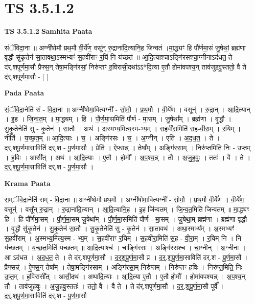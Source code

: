 \documentclass[17pt]{extarticle}
\begin{document}
\section{ TS 3.5.1.2 }

\textbf{TS 3.5.1.2 } \newline
\textbf{Samhita Paata} \newline

संॅविदा॒ना ॥ अग्नी॑षोमौ प्रथ॒मौ वी॒र्ये॑ण॒ वसू᳚न् रु॒द्राना॑दि॒त्यानि॒ह जि॑न्वतं ।मा॒द्ध्यꣳ हि पौ᳚र्णमा॒सं जु॒षेथां॒ ब्रह्म॑णा वृ॒द्धौ सु॑कृ॒तेन॑ सा॒तावथा॒ऽस्मभ्यꣳ॑ स॒हवी॑राꣳ र॒यिं नि य॑च्छतं ॥ आ॒दि॒त्याश्चाऽङ्गि॑रसश्चा॒ग्नीनाऽद॑धत॒ ते द॑र्.शपूर्णमा॒सौ प्रैफ्स॒न् तेषा॒मङ्गि॑रसां॒ निरु॑प्तꣳ ह॒विरासी॒दथा॑ऽऽ*दि॒त्या ए॒तौ होमा॑वपश्य॒न् ताव॑जुहवु॒स्ततो॒ वै ते द॑र्.शपूर्णमा॒सौ - [  ] \newline

\textbf{Pada Paata} \newline

सं॒ॅवि॒दा॒नेति॑ सं - वि॒दा॒ना ॥ अग्नी॑षोमा॒वित्यग्नी᳚ - सो॒मौ॒ । प्र॒थ॒मौ । वी॒र्ये॑ण । वसून्॑ । रु॒द्रान् । आ॒दि॒त्यान् । इ॒ह । जि॒न्व॒त॒म् ॥ मा॒द्ध्यम् । हि । पौ॒र्ण॒मा॒समिति॑ पौर्ण - मा॒सम् । जु॒षेथा᳚म् । ब्रह्म॑णा । वृ॒द्धौ । सु॒कृ॒तेनेति॑ सु - कृ॒तेन॑ । सा॒तौ । अथ॑ । अ॒स्मभ्य॒मित्य॒स्म-भ्य॒म् । स॒हवी॑रा॒मिति॑ स॒ह-वी॒रा॒म् । र॒यिम् । नीति॑ । य॒च्छ॒त॒म् ॥ आ॒दि॒त्याः । च॒ । अङ्गि॑रसः । च॒ । अ॒ग्नीन् । एति॑ । अ॒द॒ध॒त॒ । ते । द॒र्॒.श॒पू॒र्ण॒मा॒साविति॑ दर्.श - पू॒र्ण॒मा॒सौ । प्रेति॑ । ऐ॒फ्स॒न्न् । तेषा᳚म् । अङ्गि॑रसाम् । निरु॑प्त॒मिति॒ निः - उ॒प्त॒म् । ह॒विः । आसी᳚त् । अथ॑ । आ॒दि॒त्याः । ए॒तौ । होमौ᳚ । अ॒प॒श्य॒न्न् । तौ । अ॒जु॒ह॒वुः॒ । ततः॑ । वै । ते । द॒र्॒.श॒पू॒र्ण॒मा॒साविति॑ दर्.श - पू॒र्ण॒मा॒सौ ।  \newline


\textbf{Krama Paata} \newline

स॒म्ॅवि॒दा॒नेति॑ सम् - वि॒दा॒ना ॥ अग्नी॑षोमौ प्रथ॒मौ । अग्नी॑षोमा॒वित्यग्नी᳚ - सो॒मौ॒ । प्र॒थ॒मौ वी॒र्ये॑ण । वी॒र्ये॑ण॒ वसून्॑ । वसू᳚न् रु॒द्रान् । रु॒द्राना॑दि॒त्यान् । आ॒दि॒त्यानि॒ह । इ॒ह जि॑न्वतम् । जि॒न्व॒त॒मिति॑ जिन्वतम् ॥ मा॒द्ध्यꣳ हि । हि पौ᳚र्णमा॒सम् । पौ॒र्ण॒मा॒सम् जु॒षेथा᳚म् । पौ॒र्ण॒मा॒समिति॑ पौर्ण - मा॒सम् । जु॒षेथा॒म् ब्रह्म॑णा । ब्रह्म॑णा वृ॒द्धौ । वृ॒द्धौ सु॑कृ॒तेन॑ । सु॒कृ॒तेन॑ सा॒तौ । सु॒कृ॒तेनेति॑ सु - कृ॒तेन॑ । सा॒तावथ॑ । अथा॒स्मभ्य᳚म् । अ॒स्मभ्यꣳ॑ स॒हवी॑राम् । अ॒स्मभ्य॒मित्य॒स्म - भ्य॒म् । स॒हवी॑राꣳ र॒यिम् । स॒हवी॑रा॒मिति॑ स॒ह - वी॒रा॒म् । र॒यिम् नि । नि य॑च्छतम् । य॒च्छ॒त॒मिति॑ यच्छतम् ॥ आ॒दि॒त्याश्च॑ । चाङ्गि॑रसः । अङ्गि॑रसश्च । चा॒ग्नीन् । अ॒ग्नीना । आ ऽद॑धत । अ॒द॒ध॒त॒ ते । ते द॑र्.शपूर्णमा॒सौ । द॒र्॒श॒पू॒र्ण॒मा॒सौ प्र । द॒र्॒.श॒पू॒र्ण॒मा॒साविति॑ दर्.श - पू॒र्ण॒मा॒सौ । प्रैफ्सन्न्॑ । ऐ॒फ्स॒न् तेषा᳚म् । तेषा॒मङ्गि॑रसाम् । अङ्गि॑रसा॒म् निरु॑प्तम् । निरु॑प्तꣳ ह॒विः । निरु॑प्त॒मिति॒ निः - उ॒प्त॒म् । ह॒विरासी᳚त् । आसी॒दथ॑ । अथा॑दि॒त्याः । आ॒दि॒त्या ए॒तौ । ए॒तौ होमौ᳚ । होमा॑वपश्यन्न् । अ॒प॒श्य॒न् तौ । ताव॑जुहवुः । अ॒जु॒ह॒वु॒स्ततः॑ । ततो॒ वै । वै ते । ते द॑र्.शपूर्णमा॒सौ । द॒र्॒.श॒पू॒र्ण॒मा॒सौ पूर्वे᳚ । द॒र्॒.श॒पू॒र्ण॒मा॒साविति॑ दर्.श - पू॒र्ण॒मा॒सौ \newline
\end{document}
